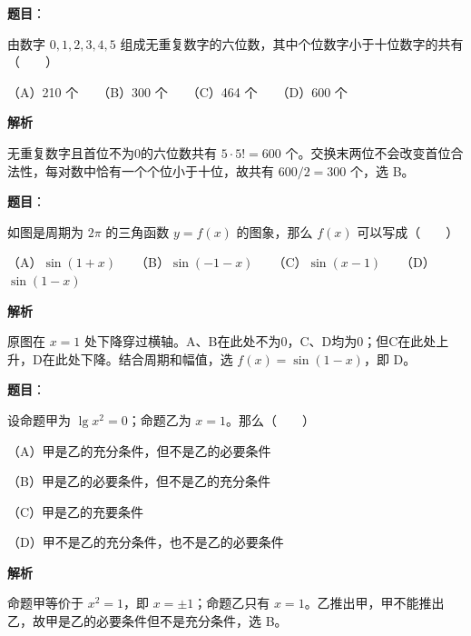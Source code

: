 \begin{answer}

\textbf{题目}：

由数字 $0,1,2,3,4,5$ 组成无重复数字的六位数，其中个位数字小于十位数字的共有\mbox{（　　）}

（A）210 个　　（B）300 个　　（C）464 个　　（D）600 个

\textbf{解析}

无重复数字且首位不为0的六位数共有 $5\cdot5!=600$ 个。交换末两位不会改变首位合法性，每对数中恰有一个个位小于十位，故共有 $600/2=300$ 个，选 B。


\end{answer}
\begin{answer}

\textbf{题目}：

如图是周期为 $2\pi$ 的三角函数 $y=f(x)$ 的图象，那么 $f(x)$ 可以写成\mbox{（　　）}
\nopagebreak[4]
\begin{center}\end{center}
\nopagebreak[4]
（A）$\sin(1+x)$　　（B）$\sin(-1-x)$　　（C）$\sin(x-1)$　　（D）$\sin(1-x)$

\textbf{解析}

原图在 $x=1$ 处下降穿过横轴。A、B在此处不为0，C、D均为0；但C在此处上升，D在此处下降。结合周期和幅值，选 $f(x)=\sin(1-x)$，即 D。


\end{answer}
\begin{answer}

\textbf{题目}：

设命题甲为 $\lg x^2=0$；命题乙为 $x=1$。那么\mbox{（　　）}

（A）甲是乙的充分条件，但不是乙的必要条件

（B）甲是乙的必要条件，但不是乙的充分条件

（C）甲是乙的充要条件

（D）甲不是乙的充分条件，也不是乙的必要条件

\textbf{解析}

命题甲等价于 $x^2=1$，即 $x=\pm1$；命题乙只有 $x=1$。乙推出甲，甲不能推出乙，故甲是乙的必要条件但不是充分条件，选 B。


\end{answer}

